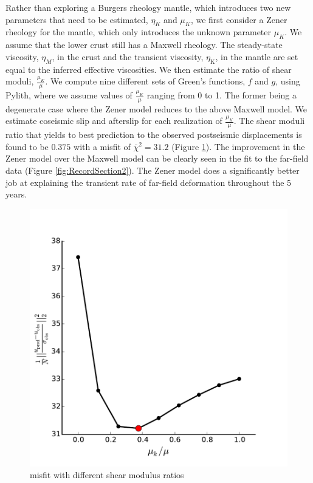 \documentclass[review]{elsarticle}
\begin{document}
Rather than exploring a Burgers rheology mantle, which introduces two new parameters that need to be estimated, $\eta_{K}$ and $\mu_{K}$, we first consider a Zener rheology for the mantle, which only introduces the unknown parameter $\mu_{K}$.  We assume that the lower crust still has a Maxwell rheology. The steady-state viscosity, $\eta_{M}$, in the crust and the transient viscosity, $\eta_\mathrm{K}$, in the mantle are set equal to the inferred effective viscosities.  We then estimate the ratio of shear moduli, $\frac{\mu_K}{\mu}$. We compute nine different sets of Green's functions, $f$ and $g$, using Pylith, where we assume values of $\frac{\mu_K}{\mu}$ ranging from 0 to 1. The former being a degenerate case where the Zener model reduces to the above Maxwell model.  We estimate coseismic slip and afterslip for each realization of $\frac{\mu_K}{\mu}$.  The shear moduli ratio that yields to best prediction to the observed postseismic displacements is found to be $0.375$ with a misfit of $\bar\chi^2=31.2$ (Figure \ref{fig:ShearModulusRatio}).  The improvement in the Zener model over the Maxwell model can be clearly seen in the fit to the far-field data (Figure \ref{fig:RecordSection2}). The Zener model does a significantly better job at explaining the transient rate of far-field deformation throughout the 5 years.  

\begin{figure}
\includegraphics[scale=0.8]{Figures/RatioMisfit}
\centering 
\caption{misfit with different shear modulus ratios}
\label{fig:ShearModulusRatio}
\end{figure}
\end{document}
